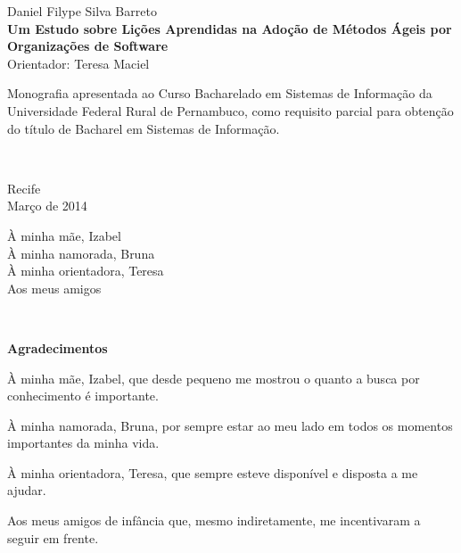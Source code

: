 %
\hyphenation{}

\vspace*{0.0cm}
{\center
{\Large Daniel Filype Silva Barreto}\\[2.4cm]
{\huge \bf Um Estudo sobre Lições Aprendidas na Adoção de Métodos Ágeis por Organizações de Software}\\[2.0cm]
{\Large Orientador: Teresa Maciel}}\\[2.0cm]

{\raggedleft
\begin{minipage}[t]{8.3cm}
\setlength{\baselineskip}{0.25in}
Monografia apresentada ao Curso Bacharelado em Sistemas de Informação  da Universidade Federal Rural de Pernambuco, como requisito parcial para obtenção do título de Bacharel em Sistemas de Informação.\end{minipage}\\[2cm]}
\vspace{3cm}
{\center Recife \\[3mm]
Março de 2014 \\}

\newpage
\vspace*{18cm}
{\raggedleft
\begin{minipage}[t]{6.0cm}
\setlength{\baselineskip}{0.25in}
À minha mãe, Izabel\\
À minha namorada, Bruna\\
À minha orientadora, Teresa\\
Aos meus amigos\\
\end{minipage}\\[2cm]}



\newpage
\begin{center}
{\Large \bf Agradecimentos}
\end{center}
\vspace*{-0.06in}

À minha mãe, Izabel, que desde pequeno me mostrou o quanto a busca por conhecimento é importante.

À minha namorada, Bruna, por sempre estar ao meu lado em todos os momentos importantes da minha vida.

À minha orientadora, Teresa, que sempre esteve disponível e disposta a me ajudar.

Aos meus amigos de infância que, mesmo indiretamente, me incentivaram a seguir em frente.


